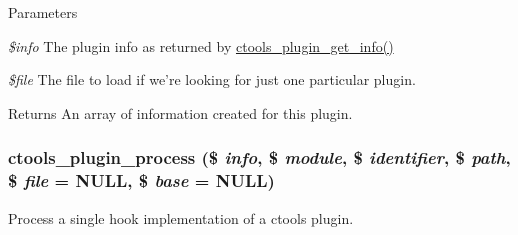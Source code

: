 \begin{DoxyParams}{Parameters}
\item[{\em \$info}]The plugin info as returned by \hyperlink{ctools_2includes_2plugins_8inc_addf3f6a3107a10cf5fb701420a9f8dcb}{ctools\_\-plugin\_\-get\_\-info()} \item[{\em \$file}]The file to load if we're looking for just one particular plugin.\end{DoxyParams}
\begin{DoxyReturn}{Returns}
An array of information created for this plugin. 
\end{DoxyReturn}
\hypertarget{ctools_2includes_2plugins_8inc_aff587a2748bb8d3878f2d2a4f9250b32}{
\subsubsection[{ctools\_\-plugin\_\-process}]{\setlength{\rightskip}{0pt plus 5cm}ctools\_\-plugin\_\-process (\$ {\em info}, \/  \$ {\em module}, \/  \$ {\em identifier}, \/  \$ {\em path}, \/  \$ {\em file} = {\ttfamily NULL}, \/  \$ {\em base} = {\ttfamily NULL})}}
\label{ctools_2includes_2plugins_8inc_aff587a2748bb8d3878f2d2a4f9250b32}
Process a single hook implementation of a ctools plugin.


